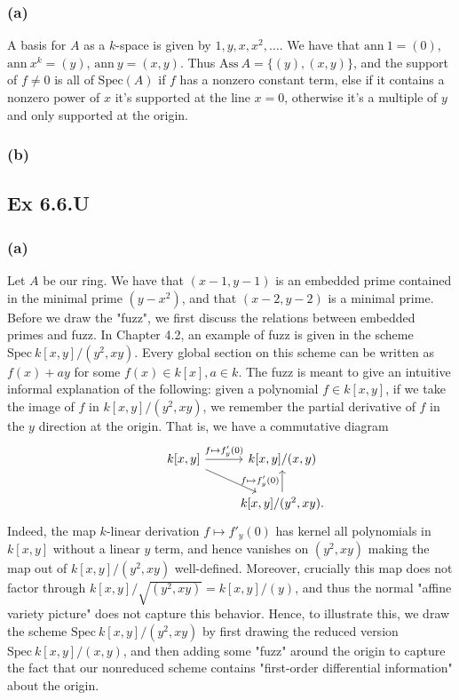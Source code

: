 \documentclass{article}
\theoremstyle{definition}
\newcommand{\Spec}{\text{Spec}}
\newcommand{\ann}{\text{ann}}
\newcommand{\Ass}{\text{Ass}}
\begin{document}
\subsubsection*{(a)}

A basis for $A$ as a $k$-space is given by $1, y, x, x^{2}, \ldots$. We have
that $\ann\ 1 = (0)$, $\ann\ x^{k} = (y)$, $\ann\ y = (x, y)$. Thus $\Ass\ A =
	\{(y), (x, y)\}$, and the support of $f \not = 0$ is all of $\Spec(A)$ if $f$ has
a nonzero constant term, else if it contains a nonzero power of $x$ it's supported
at the line $x=0$, otherwise it's a multiple of $y$ and only supported at the
origin.

\subsubsection*{(b)}

\subsection*{Ex 6.6.U}
\subsubsection*{(a)}

Let $A$ be our ring. We have that $(x - 1, y - 1)$ is an embedded prime
contained in the minimal prime $(y - x^{2})$, and that $(x - 2, y - 2)$ is a
minimal prime. \\

Before we draw the "fuzz", we first discuss the relations between embedded
primes and fuzz. In Chapter 4.2, an example of fuzz is given in the scheme
$\Spec\ k[x, y]/(y^{2}, xy)$. Every global section on this scheme can be
written as $f(x) + ay$ for some $f(x) \in k[x], a \in k$. The fuzz is
meant to give an intuitive informal explanation of the following:
given a polynomial $f \in k[x, y]$, if we take the image of
$f$ in $k[x, y]/(y^{2}, xy)$, we remember the partial derivative
of $f$ in the $y$ direction at the origin. That is, we have a commutative
diagram
\[
	\begin{tikzcd}
		& k[x, y]
		\ar[r, "f \mapsto f'_{y}(0)"]
		\ar[dr]
		& k[x, y]/(x, y) \\
		&
		& k[x, y]/(y^{2}, xy)
		\ar[u, "f \mapsto f'_{y}(0)"].
	\end{tikzcd}
\]
Indeed, the map $k$-linear derivation $f \mapsto f'_{y}(0)$ has kernel all
polynomials in $k[x, y]$ without a linear $y$ term, and hence vanishes on
$(y^{2}, xy)$ making the map out of $k[x, y]/(y^{2}, xy)$ well-defined.
Moreover, crucially this map does not factor through $k[x, y]/\sqrt{(y^{2}, xy)}
	= k[x, y]/(y)$, and thus the normal "affine variety picture" does not capture
this behavior. Hence, to illustrate this, we draw the scheme $\Spec\ k[x,
			y]/(y^{2}, xy)$ by first drawing the reduced version $\Spec\ k[x, y]/(x, y)$,
and then adding some "fuzz" around the origin to capture the fact that our
nonreduced scheme contains "first-order differential information" about the
origin. \\
\end{document}
